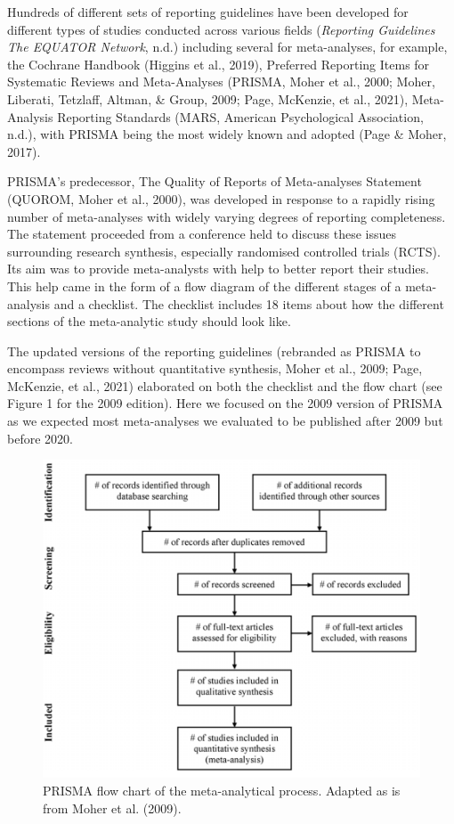 \documentclass[
  man,floatsintext]{apa6}
\begin{document}
Hundreds of different sets of reporting guidelines have been developed for different types of studies conducted across various fields (\emph{Reporting Guidelines \textbar{} {The EQUATOR Network}}, n.d.) including several for meta-analyses, for example, the Cochrane Handbook (Higgins et al., 2019), Preferred Reporting Items for Systematic Reviews and Meta-Analyses (PRISMA, Moher et al., 2000; Moher, Liberati, Tetzlaff, Altman, \& Group, 2009; Page, McKenzie, et al., 2021), Meta-Analysis Reporting Standards (MARS, American Psychological Association, n.d.), with PRISMA being the most widely known and adopted (Page \& Moher, 2017).

PRISMA's predecessor, The Quality of Reports of Meta-analyses Statement (QUOROM, Moher et al., 2000), was developed in response to a rapidly rising number of meta-analyses with widely varying degrees of reporting completeness. The statement proceeded from a conference held to discuss these issues surrounding research synthesis, especially randomised controlled trials (RCTS). Its aim was to provide meta-analysts with help to better report their studies.
This help came in the form of a flow diagram of the different stages of a meta-analysis and a checklist. The checklist includes 18 items about how the different sections of the meta-analytic study should look like.

The updated versions of the reporting guidelines (rebranded as PRISMA to encompass reviews without quantitative synthesis, Moher et al., 2009; Page, McKenzie, et al., 2021) elaborated on both the checklist and the flow chart (see Figure 1 for the 2009 edition). Here we focused on the 2009 version of PRISMA as we expected most meta-analyses we evaluated to be published after 2009 but before 2020.
\newpage

\begin{figure}[H]

{\centering \includegraphics[width=0.85\linewidth]{figures/prisma} 

}

\caption{PRISMA flow chart of the meta-analytical process. Adapted as is from Moher et al. (2009).}\label{fig:fig1}
\end{figure}
\end{document}
